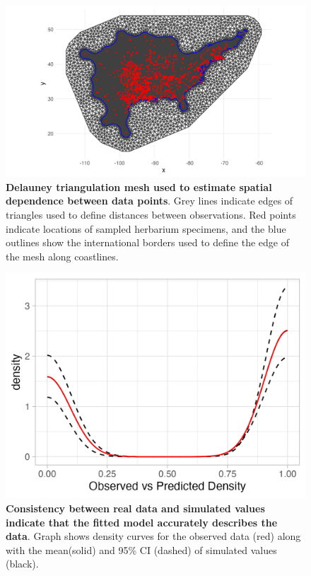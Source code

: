 \documentclass[11pt]{article}
\begin{document}
	\begin{figure}[H]
		\centering
		\includegraphics[width = \linewidth]{mesh_plot.png}
		\caption{\textbf{Delauney triangulation mesh used to estimate spatial dependence between data points}. Grey lines indicate edges of triangles used to define distances between observations. Red points indicate locations of sampled herbarium specimens, and the blue outlines show the international borders used to define the edge of the mesh along coastlines.}
	\end{figure}

\begin{figure}[H]
	\centering
	\includegraphics[width = .8\linewidth]{density_plot.png}
	\caption{\textbf{Consistency between real data and simulated values indicate that the fitted model accurately describes the data}. Graph shows density curves for the observed data (red) along with the mean(solid) and 95\% CI (dashed) of simulated values (black).}
\end{figure}
\end{document}

